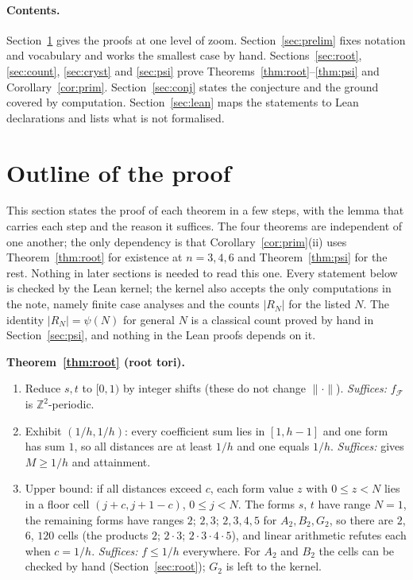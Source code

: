 \documentclass[11pt]{amsart}
\theoremstyle{definition}
\theoremstyle{remark}
\newcommand{\Z}{\mathbb{Z}}
\newcommand{\dist}[1]{\lVert #1\rVert}
\begin{document}
\paragraph{Contents.} Section~\ref{sec:outline} gives the proofs at one level of zoom. Section~\ref{sec:prelim} fixes notation and vocabulary and works the smallest case by hand. Sections~\ref{sec:root}, \ref{sec:count}, \ref{sec:cryst} and \ref{sec:psi} prove Theorems~\ref{thm:root}--\ref{thm:psi} and Corollary~\ref{cor:prim}. Section~\ref{sec:conj} states the conjecture and the ground covered by computation. Section~\ref{sec:lean} maps the statements to Lean declarations and lists what is not formalised.

\section{Outline of the proof}\label{sec:outline}

This section states the proof of each theorem in a few steps, with the lemma that carries each step and the reason it suffices. The four theorems are independent of one another; the only dependency is that Corollary~\ref{cor:prim}(ii) uses Theorem~\ref{thm:root} for existence at $n=3,4,6$ and Theorem~\ref{thm:psi} for the rest. Nothing in later sections is needed to read this one. Every statement below is checked by the Lean kernel; the kernel also accepts the only computations in the note, namely finite case analyses and the counts $|R_N|$ for the listed $N$. The identity $|R_N|=\psi(N)$ for general $N$ is a classical count proved by hand in Section~\ref{sec:psi}, and nothing in the Lean proofs depends on it.

\medskip
\noindent\textbf{Theorem~\ref{thm:root} (root tori).}
\begin{enumerate}[leftmargin=2em,label=(R\arabic*)]
\item Reduce $s,t$ to $[0,1)$ by integer shifts (these do not change $\dist{\cdot}$). \emph{Suffices:} $f_{\mathcal F}$ is $\Z^2$-periodic.
\item Exhibit $(1/h,1/h)$: every coefficient sum lies in $[1,h-1]$ and one form has sum $1$, so all distances are at least $1/h$ and one equals $1/h$. \emph{Suffices:} gives $M\ge1/h$ and attainment.
\item Upper bound: if all distances exceed $c$, each form value $z$ with $0\le z<N$ lies in a floor cell $(j+c,j+1-c)$, $0\le j<N$. The forms $s$, $t$ have range $N=1$, the remaining forms have ranges $2$; $2,3$; $2,3,4,5$ for $A_2,B_2,G_2$, so there are $2$, $6$, $120$ cells (the products $2$; $2\cdot3$; $2\cdot3\cdot4\cdot5$), and linear arithmetic refutes each when $c=1/h$. \emph{Suffices:} $f\le1/h$ everywhere. For $A_2$ and $B_2$ the cells can be checked by hand (Section~\ref{sec:root}); $G_2$ is left to the kernel.
\end{enumerate}
\end{document}
